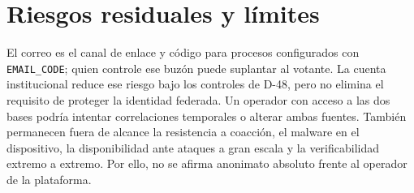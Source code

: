 \section{Riesgos residuales y límites}
El correo es el canal de enlace y código para procesos configurados con
\texttt{EMAIL\_CODE}; quien controle ese buzón puede suplantar al votante. La
cuenta institucional reduce ese riesgo bajo los controles de D-48, pero no
elimina el requisito de proteger la identidad federada. Un operador con acceso
a las dos bases podría intentar correlaciones temporales o alterar ambas
fuentes. También permanecen fuera de alcance la resistencia a coacción, el
malware en el dispositivo, la disponibilidad ante ataques a gran escala y la
verificabilidad extremo a extremo. Por ello, no se afirma anonimato absoluto
frente al operador de la plataforma.
